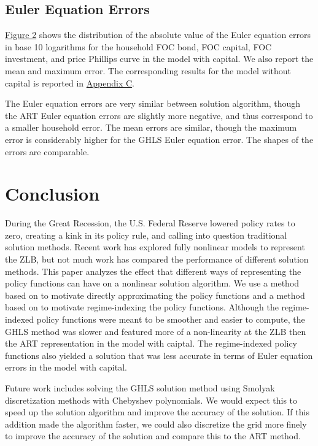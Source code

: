 \documentclass[12pt, final]{article}
\begin{document}
\subsection{Euler Equation Errors} \hyperlink{Figure 2}{Figure 2} shows the distribution of the absolute value of the Euler equation errors in base 10 logarithms for the household FOC bond, FOC capital, FOC investment, and price Phillips curve in the model with capital. We also report the mean and maximum error. The corresponding results for the model without capital is reported in \hyperlink{Appendix C}{Appendix C}.

The Euler equation errors are very similar between solution algorithm, though the ART
Euler equation errors are slightly more negative, and thus correspond to a smaller household error.
The mean errors are similar, though the maximum error is considerably higher for the GHLS
Euler equation error. The shapes of the errors are comparable.

\section[Section 5]{Conclusion \hypertarget{Section 5}{}} 

During the Great Recession, the U.S. Federal Reserve lowered policy rates to zero, creating a kink in its policy rule, and calling into question traditional solution methods. Recent work has explored fully nonlinear models to represent the ZLB, but not much work has compared the performance of different solution methods. This paper analyzes the effect that different ways of representing the policy functions can have on a nonlinear solution algorithm. We use a method based on \hyperlink{Atkinson}{\color{black}{Atkinson et al.\ (2019)}} to motivate directly approximating the policy functions and a method based on  \hyperlink{Gust}{\color{black}{Gust et al.\ (2017)}} to motivate regime-indexing the policy functions. Although the regime-indexed policy functions were meant to be smoother and easier to compute, the GHLS method was slower and featured more of a non-linearity at the ZLB then the ART representation in the model with caiptal. The regime-indexed policy functions also yielded a solution that was less accurate in terms of Euler equation errors in the model with capital. 

Future work includes solving the GHLS solution method using Smolyak discretization methods with Chebyshev polynomials. We would expect this to speed up the solution algorithm and improve the accuracy of the solution. If this addition made the algorithm faster, we could also discretize the grid more finely to improve the accuracy of the solution and compare this to the ART method.
\end{document}
